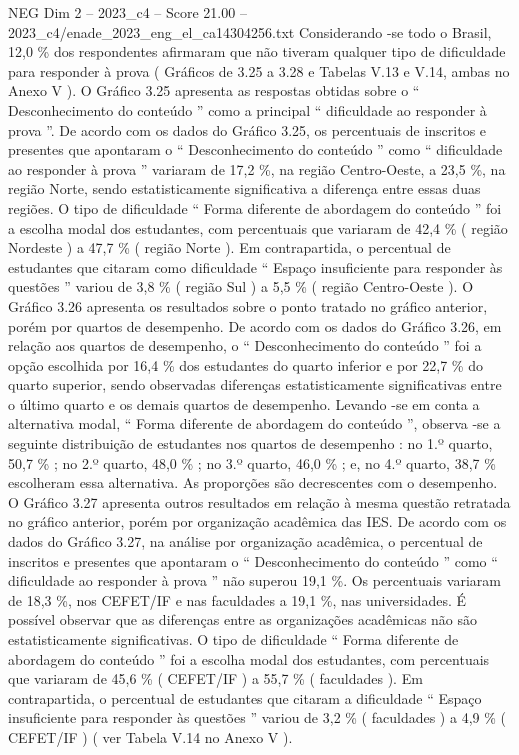 \begin{textsample}{NEG Dim 2 – 2023\_c4 – Score 21.00 – 2023\_c4/enade\_2023\_eng\_el\_ca14304256.txt}
Considerando -se todo o Brasil, 12,0 \% dos respondentes afirmaram que não tiveram qualquer tipo de dificuldade para responder à prova ( Gráficos de 3.25 a 3.28 e Tabelas V.13 e V.14, ambas no Anexo V ).
O Gráfico 3.25 apresenta as respostas obtidas sobre o “ Desconhecimento do conteúdo ” como a principal “ dificuldade ao responder à prova ”.
De acordo com os dados do Gráfico 3.25, os percentuais de inscritos e presentes que apontaram o “ Desconhecimento do conteúdo ” como “ dificuldade ao responder à prova ” variaram de 17,2 \%, na região Centro-Oeste, a 23,5 \%, na região Norte, sendo estatisticamente significativa a diferença entre essas duas regiões.
O tipo de dificuldade “ Forma diferente de abordagem do conteúdo ” foi a escolha modal dos estudantes, com percentuais que variaram de 42,4 \% ( região Nordeste ) a 47,7 \% ( região Norte ).
Em contrapartida, o percentual de estudantes que citaram como dificuldade “ Espaço insuficiente para responder às questões ” variou de 3,8 \% ( região Sul ) a 5,5 \% ( região Centro-Oeste ).
O Gráfico 3.26 apresenta os resultados sobre o ponto tratado no gráfico anterior, porém por quartos de desempenho.
De acordo com os dados do Gráfico 3.26, em relação aos quartos de desempenho, o “ Desconhecimento do conteúdo ” foi a opção escolhida por 16,4 \% dos estudantes do quarto inferior e por 22,7 \% do quarto superior, sendo observadas diferenças estatisticamente significativas entre o último quarto e os demais quartos de desempenho.
Levando -se em conta a alternativa modal, “ Forma diferente de abordagem do conteúdo ”, observa -se a seguinte distribuição de estudantes nos quartos de desempenho : no 1.º quarto, 50,7 \% ; no 2.º quarto, 48,0 \% ; no 3.º quarto, 46,0 \% ; e, no 4.º quarto, 38,7 \% escolheram essa alternativa.
As proporções são decrescentes com o desempenho.
O Gráfico 3.27 apresenta outros resultados em relação à mesma questão retratada no gráfico anterior, porém por organização acadêmica das IES.
De acordo com os dados do Gráfico 3.27, na análise por organização acadêmica, o percentual de inscritos e presentes que apontaram o “ Desconhecimento do conteúdo ” como “ dificuldade ao responder à prova ” não superou 19,1 \%.
Os percentuais variaram de 18,3 \%, nos CEFET/IF e nas faculdades a 19,1 \%, nas universidades.
É possível observar que as diferenças entre as organizações acadêmicas não são estatisticamente significativas.
O tipo de dificuldade “ Forma diferente de abordagem do conteúdo ” foi a escolha modal dos estudantes, com percentuais que variaram de 45,6 \% ( CEFET/IF ) a 55,7 \% ( faculdades ).
Em contrapartida, o percentual de estudantes que citaram a dificuldade “ Espaço insuficiente para responder às questões ” variou de 3,2 \% ( faculdades ) a 4,9 \% ( CEFET/IF ) ( ver Tabela V.14 no Anexo V ).

\end{textsample}
